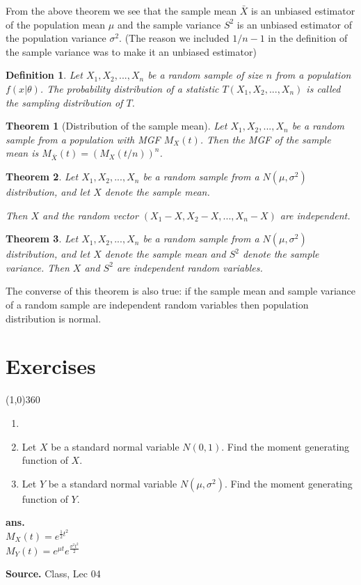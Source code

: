 \documentclass[12pt,twoside]{report}
\newtheorem{defn}{Definition}
\newtheorem{thm}{Theorem}
\newenvironment*{ans}{\textbf{ans.}\space\em\\}{\par}
\newenvironment*{source}{\hfill\scriptsize\textbf{Source.}\space}{\par}
\begin{document}
From the above theorem we see that the sample mean $\bar{X}$ is an unbiased estimator of the population mean $\mu$ and the sample variance $S^2$ is an unbiased estimator of the population variance $\sigma^2$. (The reason we included $1/n-1$ in the  definition of the sample variance was to make it an unbiased estimator)

\begin{defn}
    Let $X_1, X_2, ..., X_n$ be a random sample of size $n$ from a population $f(x|\theta)$. The probability distribution of a statistic $T(X_1, X_2, ..., X_n)$ is called the sampling distribution of $T$.
\end{defn}

\begin{thm}[Distribution of the sample mean]
    Let $X_1, X_2, ..., X_n$ be a random sample from a population with MGF $M_X(t)$. Then the MGF of the sample mean is $M_{\bar{X}} (t) = (M_X (t/n))^n$.
\end{thm}

\begin{thm}
    Let $X_1, X_2, . . . , X_n$ be a random sample from a $N(\mu, \sigma^2)$ distribution, and let $X$ denote the sample mean.

    Then $X$ and the random vector $(X_1 - X, X_2 - X, . . . , X_n - X)$ are independent.
\end{thm}

\begin{thm}
    Let $X_1, X_2, . . . , X_n$ be a random sample from a $N(\mu, \sigma^2)$ distribution, 
    and let $X$ denote the sample mean and $S^2$ denote the sample variance. Then $X$ and $S^2$ are independent random variables.
\end{thm}
The converse of this theorem is also true: if the sample mean and sample variance of a random sample are independent random variables then population distribution is normal.

\newpage
\chapter{Exercises}
\line(1,0){360} \\


\begin{samepage}
\begin{ex}
    \begin{enumerate}[label=(\roman*)]
        \item[]
        \item Let $X$ be a standard normal variable $N(0,1)$. Find the moment generating function of $X$.
        \item Let $Y$ be a standard normal variable $N(\mu,\sigma ^2)$. Find the moment generating function of $Y$.
    \end{enumerate}
\end{ex}
\begin{ans}
$M_X(t) = e^{\frac{1}{2} t^2}$ \\
$M_Y(t) = e^{\mu t} e^{\frac{\sigma^2 t^2}{2}}$ 
\end{ans}
\begin{source}
Class, Lec 04
\end{source}
\end{samepage}
\end{document}
